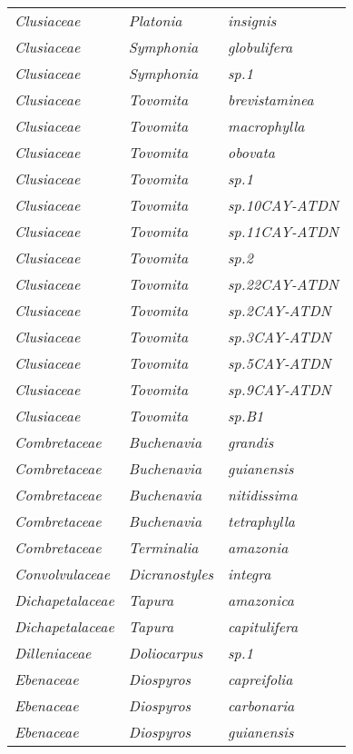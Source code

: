 \documentclass[fleqn,10pt]{ArtEcoFoG} %
\renewenvironment{table}{\begin{table*}}{\end{table*}\ignorespacesafterend}
\begin{document}
\begin{table}
\begin{tabular}[t]{lll}
\em{Clusiaceae} & \em{Platonia} & \em{insignis}\\
\addlinespace
\em{Clusiaceae} & \em{Symphonia} & \em{globulifera}\\
\em{Clusiaceae} & \em{Symphonia} & \em{sp.1}\\
\em{Clusiaceae} & \em{Tovomita} & \em{brevistaminea}\\
\em{Clusiaceae} & \em{Tovomita} & \em{macrophylla}\\
\em{Clusiaceae} & \em{Tovomita} & \em{obovata}\\
\addlinespace
\em{Clusiaceae} & \em{Tovomita} & \em{sp.1}\\
\em{Clusiaceae} & \em{Tovomita} & \em{sp.10CAY-ATDN}\\
\em{Clusiaceae} & \em{Tovomita} & \em{sp.11CAY-ATDN}\\
\em{Clusiaceae} & \em{Tovomita} & \em{sp.2}\\
\em{Clusiaceae} & \em{Tovomita} & \em{sp.22CAY-ATDN}\\
\addlinespace
\em{Clusiaceae} & \em{Tovomita} & \em{sp.2CAY-ATDN}\\
\em{Clusiaceae} & \em{Tovomita} & \em{sp.3CAY-ATDN}\\
\em{Clusiaceae} & \em{Tovomita} & \em{sp.5CAY-ATDN}\\
\em{Clusiaceae} & \em{Tovomita} & \em{sp.9CAY-ATDN}\\
\em{Clusiaceae} & \em{Tovomita} & \em{sp.B1}\\
\addlinespace
\em{Combretaceae} & \em{Buchenavia} & \em{grandis}\\
\em{Combretaceae} & \em{Buchenavia} & \em{guianensis}\\
\em{Combretaceae} & \em{Buchenavia} & \em{nitidissima}\\
\em{Combretaceae} & \em{Buchenavia} & \em{tetraphylla}\\
\em{Combretaceae} & \em{Terminalia} & \em{amazonia}\\
\addlinespace
\em{Convolvulaceae} & \em{Dicranostyles} & \em{integra}\\
\em{Dichapetalaceae} & \em{Tapura} & \em{amazonica}\\
\em{Dichapetalaceae} & \em{Tapura} & \em{capitulifera}\\
\em{Dilleniaceae} & \em{Doliocarpus} & \em{sp.1}\\
\em{Ebenaceae} & \em{Diospyros} & \em{capreifolia}\\
\addlinespace
\em{Ebenaceae} & \em{Diospyros} & \em{carbonaria}\\
\em{Ebenaceae} & \em{Diospyros} & \em{guianensis}\\

\end{tabular}
\end{table}
\end{document}
